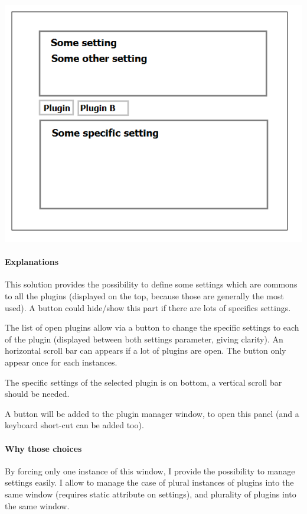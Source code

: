 \includegraphics[width=\linewidth]{images/GUI1.png}

\paragraph*{Explanations} 

This solution provides the possibility to define some settings which are commons to all the plugins (displayed on the top, because those are generally the most used). A button could hide/show this part if there are lots of specifics settings.

The list of open plugins allow via a button to change the specific settings to each of the plugin (displayed between both settings parameter, giving clarity). An horizontal scroll bar can appears if a lot of plugins are open. The button only appear once for each instances.

The specific settings of the selected plugin is on bottom, a vertical scroll bar should be needed.

\bigskip
A button will be added to the plugin manager window, to open this panel (and a keyboard short-cut can be added too).

\paragraph*{Why those choices}

By forcing only one instance of this window, I provide the possibility to manage settings easily. I allow to manage the case of plural instances of plugins into the same window (requires static attribute on settings), and plurality of plugins into the same window.

